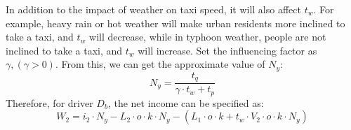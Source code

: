 In addition to the impact of weather on taxi speed, it will also affect $t_{w}$. For example, heavy rain or hot weather will make urban residents more inclined to take a taxi, and $t_{w}$ will decrease, while in typhoon weather, people are not inclined to take a taxi, and $t_w$ will increase. Set the influencing factor as $\gamma, (\gamma > 0)$. From this, we can get the approximate value of $N_{y}$:
\begin{equation}
	N_{y} = \frac{t_{q}}{\gamma \cdot t_{w} + t_{p}}
\label{N_y}
\end{equation}
Therefore, for driver $D_{b}$, the net income can be specified as:
\begin{equation}
	W_{2} = i_{2} \cdot N_{y} - L_{2} \cdot o \cdot k \cdot N_{y} - (L_{1} \cdot o \cdot k +t_{w} \cdot V_{2} \cdot o \cdot k \cdot N_{y} )
\label{W_2_2}
\end{equation}
%
%
%
%
%
